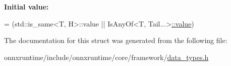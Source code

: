 {\bfseries Initial value\+:}
\begin{DoxyCode}
= (std::is\_same<T, H>::value ||
                                 IsAnyOf<T, Tail...>\mbox{\hyperlink{structonnxruntime_1_1data__types__internal_1_1IsAnyOf_3_01T_00_01H_00_01Tail_8_8_8_01_4_a352824d65827bbd08eb0035f5f11571f}{::value}})
\end{DoxyCode}


The documentation for this struct was generated from the following file\+:\begin{DoxyCompactItemize}
\item 
onnxruntime/include/onnxruntime/core/framework/\mbox{\hyperlink{data__types_8h}{data\+\_\+types.\+h}}\end{DoxyCompactItemize}
